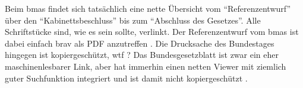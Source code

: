 Beim \gls{bmas} findet sich tatsächlich eine nette Übersicht vom \enquote{Referenzentwurf} über den \enquote{Kabinettsbeschluss} bis zum \enquote{Abschluss des Gesetzes}.
Alle Schriftstücke sind, wie es sein sollte, verlinkt. Der Referenzentwurf vom \gls{bmas} ist dabei einfach brav als PDF anzutreffen \autocite{BMAS-21.07.2020}. 
Die Drucksache des Bundestages hingegen ist kopiergeschützt, wtf \autocite{Bundestag.31.08.2020}?
Das Bundesgesetzblatt ist zwar ein eher maschinenlesbarer Link, aber hat immerhin einen netten Viewer mit ziemlich guter Suchfunktion integriert und ist damit nicht kopiergeschützt \autocite{BGBl.2020-I-Nr67}. 


\newenvironment{myenumerate}
{ \begin{enumerate}
    \setlength{\itemsep}{0pt}
    \setlength{\parskip}{0pt}
    \setlength{\parsep}{0pt}     }
{ \end{enumerate}                } 


